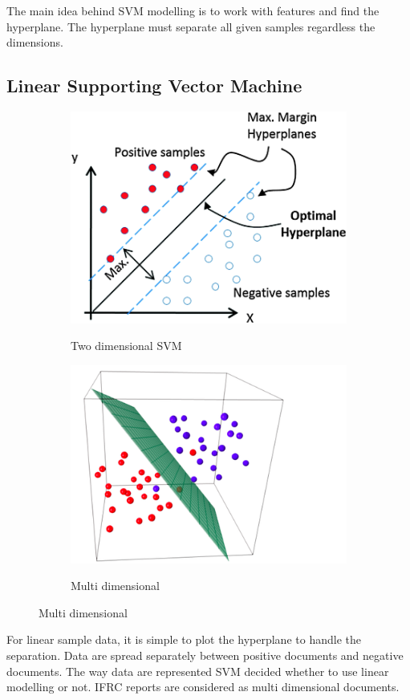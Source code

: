 The main idea behind SVM modelling is to work with features and find the hyperplane. The hyperplane must separate all given samples regardless the dimensions.
\subsection{Linear Supporting Vector Machine }
\newpage
\begin{figure}
        \begin{subfigure}{.6\textwidth}
         \includegraphics[scale=.3]    	          {images/linear.png} \label{linear}
         \caption{Two dimensional SVM}
        \end{subfigure}%
        \begin{subfigure}{\textwidth}
                \includegraphics[scale=.5]    	                 {images/multi.png}
                \label{multi}
   \caption{Multi dimensional}\end{subfigure}


\end{figure}
For linear sample data, it is simple to plot the hyperplane to handle the separation.  Data are spread separately between positive documents and negative documents. The way data are represented SVM decided  whether to use linear modelling or not. IFRC reports are considered as multi dimensional documents.

